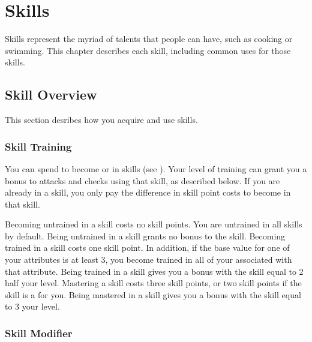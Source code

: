 \chapter{Skills}\label{Skills}

Skills represent the myriad of talents that people can have, such as cooking or swimming.
This chapter describes each skill, including common uses for those skills.

\section{Skill Overview}

    This section desribes how you acquire and use skills.

    \subsection{Skill Training}\label{Skill Training}

        You can spend  to become  or  in skills (see ).
        Your level of training can grant you a bonus to attacks and checks using that skill, as described below.
        If you are already  in a skill, you only pay the difference in skill point costs to become  in that skill.

        \begin{itemize}
             Becoming untrained in a skill costs no skill points.
                You are untrained in all skills by default.
                Being untrained in a skill grants no bonus to the skill.
             Becoming trained in a skill costs one skill point.
                In addition, if the base value for one of your attributes is at least 3, you become trained in all of your  associated with that attribute.
                Being trained in a skill gives you a bonus with the skill equal to 2 \add half your level.
             Mastering a skill costs three skill points, or two skill points if the skill is a  for you.
                Being mastered in a skill gives you a bonus with the skill equal to 3 \add your level.
        \end{itemize}

    \subsection{Skill Modifier}\label{Skill Modifier}

